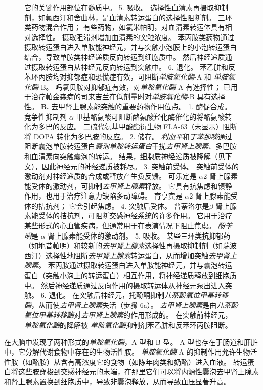 \begin{figure}[htbp]
{	它的关键作用部位在髓质中。
	5. 吸收。
	选择性血清素再摄取抑制剂，如氟西汀和舍曲林，是血清素转运蛋白的选择性阻断剂。
	三环类药物混合作用；
	有些药物，如氯米帕明，对血清素转运体具有相对选择性。
	摄取阻滞剂增加血清素的突触浓度。
	苯丙胺类药物通过摄取转运蛋白进入单胺能神经元，并与突触小泡膜上的小泡转运蛋白结合，导致单胺类神经递质反向转运到细胞质中。
	然后神经递质通过摄取转运蛋白从神经元反向转运到突触中。
	6. 退化。
	苯乙肼和反苯环丙胺均对抑郁症和恐慌症有效，可阻断\textit{单胺氧化酶}-A 和 \textit{单胺氧化酶}-B。
	吗氯贝胺对抑郁症有效，对\textit{单胺氧化酶}-A 有选择性；
	已用于治疗帕金森病的司来吉兰在低剂量时对\textit{单胺氧化酶}-B 具有选择性。 
	\textbf{B.} 去甲肾上腺素能突触的重要药物作用位点。 
	1. 酶促合成。
	竞争性抑制剂 $\alpha$-甲基酪氨酸可阻断酪氨酸羟化酶催化的将酪氨酸转化为多巴的反应。
	二硫代氨基甲酸酯衍生物 FLA-63（未显示）阻断将 DOPA 转化为多巴胺的反应。
	2. 储存。
	\textit{利血平}和\textit{丁苯那嗪}通过阻断囊泡单胺转运蛋白\textit{囊泡单胺转运蛋白}干扰\textit{去甲肾上腺素}、多巴胺和血清素向突触囊泡的转运。
	结果，细胞质神经递质被降解（见下文），因此神经元的神经递质被耗尽。
	3. 突触前受体。
	突触前受体的激动剂对神经递质的合成或释放产生负反馈。
	可乐定是 $\alpha$2-肾上腺素能受体的激动剂，可抑制\textit{去甲肾上腺素}释放。
	它具有抗焦虑和镇静作用，也用于治疗注意力缺陷多动障碍。
	育亨宾是 $\alpha$2-肾上腺素能受体的拮抗剂； 它会引起焦虑。
	4. 突触后受体。
	普萘洛尔是$\beta$-肾上腺素能受体的拮抗剂，可阻断交感神经系统的许多作用。
	它用于治疗某些形式的心血管疾病，但通常用于在表演情况下阻止焦虑。
	\textit{酚苄明}是 $\alpha$-肾上腺素能受体的激动剂。
	5. 吸收。
	某些三环类抗抑郁药（如地昔帕明）和较新的\textit{去甲肾上腺素}选择性再摄取抑制剂（如瑞波西汀）选择性地阻断\textit{去甲肾上腺素}转运蛋白，从而增加突触\textit{去甲肾上腺素}。
	苯丙胺通过摄取转运蛋白进入单胺能神经元，并与囊泡转运蛋白（突触小泡上的转运蛋白）相互作用，将神经递质释放到细胞质中。
	然后神经递质通过反向作用的摄取转运体从神经元泵出进入突触。
	6. 退化。
	在突触后神经元，托酚酮抑制\textit{儿茶酚氧位甲基转移酶}，从而使\textit{去甲肾上腺素}失活（步骤 6a）。
	\textit{去甲肾上腺素}是由\textit{儿茶酚氧位甲基转移酶}对\textit{去甲肾上腺素}的作用形成的。
	在突触前神经元，\textit{单胺氧化酶}的降解被 \textit{单胺氧化酶}抑制剂苯乙肼和反苯环丙胺阻断。}
\end{figure}


在大脑中发现了两种形式的\textit{单胺氧化酶}，A 型和 B 型。
A 型也存在于肠道和肝脏中，它分解代谢食物中存在的生物活性胺。
\textit{单胺氧化酶}-A 的抑制作用允许生物活性胺（如酪胺）从含有高浓度它的食物（如陈年肉类和奶酪）进入血液。
转运蛋白将这些胺穿梭到交感神经元的末端，在那里它们可以将内源性囊泡去甲肾上腺素和肾上腺素置换到细胞质中，导致非囊泡释放，从而导致血压显著升高。


